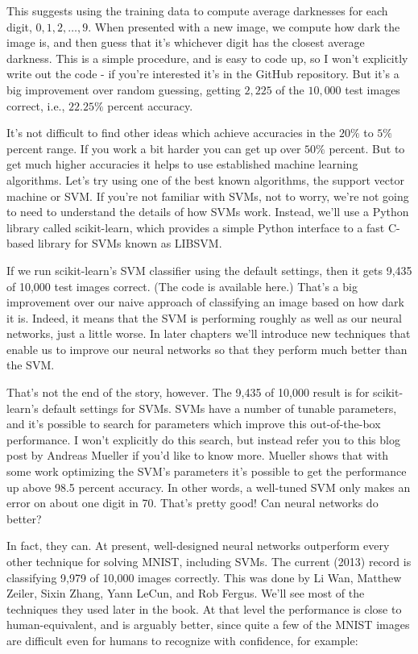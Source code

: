 \documentclass[a4paper,12pt]{report}%
\begin{document}
This suggests using the training data to compute average darknesses for each digit, $0, 1, 2, …, 9$. When presented with a new image, we compute how dark the image is, and then guess that it's whichever digit has the closest average darkness. This is a simple procedure, and is easy to code up, so I won't explicitly write out the code - if you're interested it's in the GitHub repository. But it's a big improvement over random guessing, getting $2,225$ of the $10,000$ test images correct, i.e., $22.25\%$ percent accuracy.


It's not difficult to find other ideas which achieve accuracies in the $20\%$ to $5\%$ percent range. If you work a bit harder you can get up over $50\%$ percent. But to get much higher accuracies it helps to use established machine learning algorithms. Let's try using one of the best known algorithms, the support vector machine or SVM. If you're not familiar with SVMs, not to worry, we're not going to need to understand the details of how SVMs work. Instead, we'll use a Python library called scikit-learn, which provides a simple Python interface to a fast C-based library for SVMs known as LIBSVM.

If we run scikit-learn's SVM classifier using the default settings, then it gets 9,435 of 10,000 test images correct. (The code is available here.) That's a big improvement over our naive approach of classifying an image based on how dark it is. Indeed, it means that the SVM is performing roughly as well as our neural networks, just a little worse. In later chapters we'll introduce new techniques that enable us to improve our neural networks so that they perform much better than the SVM.

That's not the end of the story, however. The 9,435 of 10,000 result is for scikit-learn's default settings for SVMs. SVMs have a number of tunable parameters, and it's possible to search for parameters which improve this out-of-the-box performance. I won't explicitly do this search, but instead refer you to this blog post by Andreas Mueller if you'd like to know more. Mueller shows that with some work optimizing the SVM's parameters it's possible to get the performance up above 98.5 percent accuracy. In other words, a well-tuned SVM only makes an error on about one digit in 70. That's pretty good! Can neural networks do better?

In fact, they can. At present, well-designed neural networks outperform every other technique for solving MNIST, including SVMs. The current (2013) record is classifying 9,979 of 10,000 images correctly. This was done by Li Wan, Matthew Zeiler, Sixin Zhang, Yann LeCun, and Rob Fergus. We'll see most of the techniques they used later in the book. At that level the performance is close to human-equivalent, and is arguably better, since quite a few of the MNIST images are difficult even for humans to recognize with confidence, for example:
\end{document}
